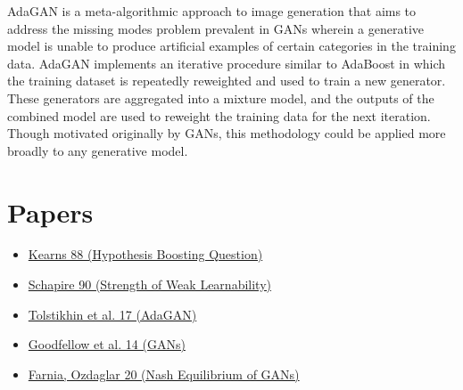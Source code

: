 \documentclass[12pt, reqno]{amsart}
\begin{document}
AdaGAN is a meta-algorithmic approach to image generation that aims to address the missing modes problem prevalent in GANs wherein a generative model is unable to produce artificial examples of certain categories in the training data. AdaGAN implements an iterative procedure similar to AdaBoost in which the training dataset is repeatedly reweighted and used to train a new generator. These generators are aggregated into a mixture model, and the outputs of the combined model are used to reweight the training data for the next iteration. Though motivated originally by GANs, this methodology could be applied more broadly to any generative model. \\

\section*{Papers}

\begin{itemize}
    \item \href{https://www.cis.upenn.edu/~mkearns/papers/boostnote.pdf}{Kearns 88 (Hypothesis Boosting Question)}
    \item \href{http://rob.schapire.net/papers/strengthofweak.pdf}{Schapire 90 (Strength of Weak Learnability)}
    \item \href{https://arxiv.org/pdf/1701.02386.pdf}{Tolstikhin et al. 17 (AdaGAN)}
    \item \href{https://arxiv.org/pdf/1406.2661.pdf}{Goodfellow et al. 14 (GANs)}
    \item \href{https://arxiv.org/pdf/2002.09124.pdf#:~:text=GANs%20trained%20using%20first%2D%20order,the%20GAN%20zero%2Dsum%20game.}{Farnia, Ozdaglar 20 (Nash Equilibrium of GANs)}
\end{itemize}
\end{document}
